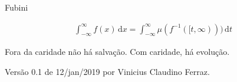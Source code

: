 \documentclass[12pt,a4paper]{article}
\begin{document}
\Large

Fubini

\normalsize

\vspace{6mm}

\begin{align}
  \int_{- \infty}^{\infty} f(x) \,\mathrm{d}x = \int_{- \infty}^{\infty} \mu ( f^{-1}([t, \infty)) ) \,\mathrm{d}t
\end{align}

\vspace{6mm}

Fora da caridade n\~ao h\'a salva\c{c}\~ao. Com caridade, h\'a evolu\c{c}\~ao.

\vspace{6mm}

Vers\~ao 0.1 de 12/jan/2019 por Vinicius Claudino Ferraz.
\end{document}
